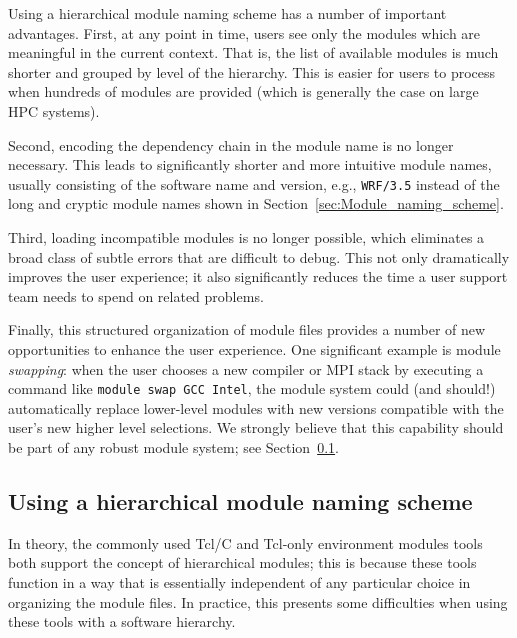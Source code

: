 
Using a hierarchical module naming scheme has a number of important
advantages. First, at any point in time, users see only the
modules which are meaningful in the current context. That is, the list of
available modules is much shorter and grouped by level of the hierarchy. This is easier for users to process when hundreds of modules are
provided (which is generally the case on large HPC systems).

Second, encoding the dependency chain in the module name is no longer
necessary. This leads to significantly shorter and more intuitive
module names, usually consisting of the software name and version, e.g.,
\texttt{\small WRF/3.5} instead of the long and cryptic module names shown in
Section~\ref{sec:Module_naming_scheme}.

Third, loading incompatible
modules is no longer possible, which eliminates a broad class of subtle errors that
are difficult to debug. This not only dramatically improves the user experience; it
also significantly reduces the time a user support team needs to spend on related
problems.

Finally, this structured organization of module files provides
a number of new opportunities to enhance the user experience. One significant
example is module \emph{swapping}: when the user chooses a new compiler or MPI
stack by executing a command like \texttt{\small module swap GCC Intel}, the module
system could (and should!) automatically replace lower-level modules with new
versions compatible with the user's new higher level selections. We strongly believe
that this capability should be part of any robust module system; see
Section~\ref{sec:using_a_hierarchy}.


\subsection{Using a hierarchical module naming scheme}
\label{sec:using_a_hierarchy}

In theory, the commonly used Tcl/C and Tcl-only environment modules tools
both support the concept of hierarchical modules; this is because these tools function in a way that is essentially independent of any particular choice in organizing the module files. In practice, this presents some difficulties when using these tools with a software hierarchy.

